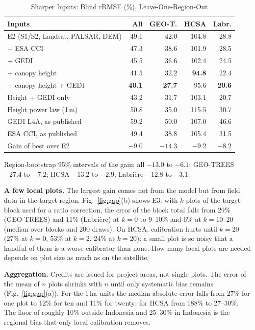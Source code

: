 \documentclass[conference,a4paper]{IEEEtran}
\begin{document}
\begin{table}[t]
\centering
\caption{Sharper Inputs: Blind rRMSE (\%), Leave-One-Region-Out}
\label{tab:gee}
\footnotesize
\setlength{\tabcolsep}{3pt}
\begin{tabular}{@{}l r r r r@{}}
\toprule
\textbf{Inputs} & \textbf{All} & \textbf{GEO-T.} & \textbf{HCSA} & \textbf{Labr.}\\
\midrule
E2 (S1/S2, Landsat, PALSAR, DEM) & 49.1 & 42.0 & 104.8 & 28.8\\
\quad + ESA CCI & 47.3 & 38.6 & 101.9 & 28.5\\
\quad + GEDI & 45.5 & 36.6 & 102.4 & 24.5\\
\quad + canopy height & 41.5 & 32.2 & \textbf{94.8} & 22.4\\
\quad + canopy height + GEDI & \textbf{40.1} & \textbf{27.7} & 95.6 & \textbf{20.6}\\
Height + GEDI only & 43.2 & 31.7 & 103.1 & 20.7\\
Height power law (1\,m) & 50.8 & 35.0 & 115.5 & 30.7\\
GEDI L4A, as published & 59.2 & 50.0 & 107.0 & 46.6\\
ESA CCI, as published & 49.4 & 38.8 & 105.4 & 31.5\\
\midrule
Gain of best over E2 & $-9.0$ & $-14.3$ & $-9.2$ & $-8.2$\\
\bottomrule
\end{tabular}

\vspace{2pt}
{\scriptsize Region-bootstrap 95\% intervals of the gain: all $-13.0$ to $-6.1$; GEO-TREES $-27.4$ to $-7.2$; HCSA $-13.2$ to $-2.9$; Labri\`ere $-12.8$ to $-3.1$.\par}
\end{table}

\textbf{A few local plots.} The largest gain comes not from the model but from field data in the target region. Fig.~\ref{fig:gap}(b) shows E3: with $k$ plots of the target block used for a ratio correction, the error of the block total falls from 29\% (GEO-TREES) and 11\% (Labri\`ere) at $k=0$ to 9--10\% and 6\% at $k=10$--20 (median over blocks and 200 draws). On HCSA, calibration hurts until $k=20$ (27\% at $k=0$, 53\% at $k=2$, 24\% at $k=20$): a small plot is so noisy that a handful of them is a worse calibrator than none. How many local plots are needed depends on plot size as much as on the satellite.

\textbf{Aggregation.} Credits are issued for project areas, not single plots. The error of the mean of $n$ plots shrinks with $n$ until only systematic bias remains (Fig.~\ref{fig:gap}(a)). For the 1\,ha units the median absolute error falls from 27\% for one plot to 12\% for ten and 11\% for twenty; for HCSA from 188\% to 27--30\%. The floor of roughly 10\% outside Indonesia and 25--30\% in Indonesia is the regional bias that only local calibration removes.
\end{document}
